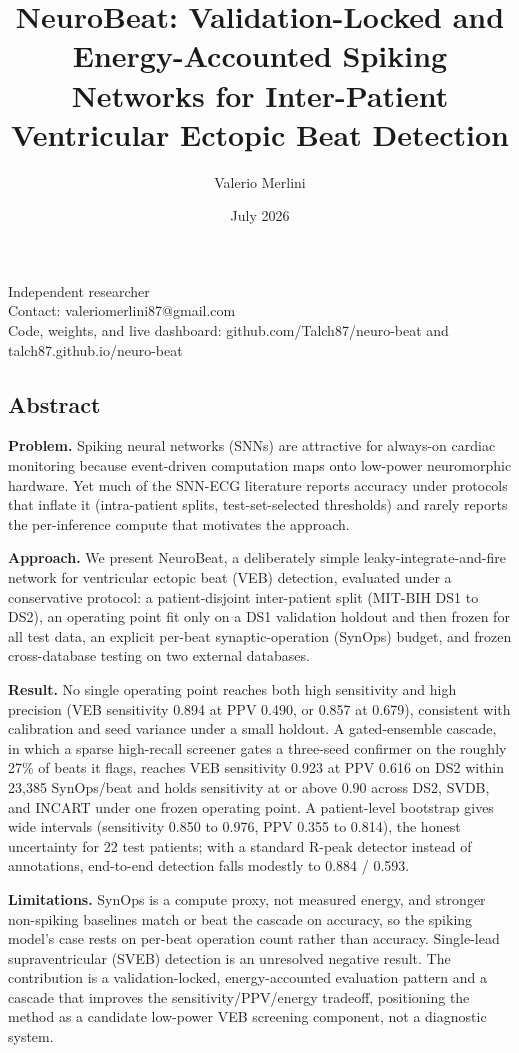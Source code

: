 \documentclass[
]{article}
\title{NeuroBeat: Validation-Locked and Energy-Accounted Spiking
Networks for Inter-Patient Ventricular Ectopic Beat Detection}
\author{Valerio Merlini}
\date{July 2026}
\begin{document}
\maketitle

Independent researcher\\
Contact: valeriomerlini87@gmail.com\\
Code, weights, and live dashboard: github.com/Talch87/neuro-beat and
talch87.github.io/neuro-beat

\subsection{Abstract}\label{abstract}

\textbf{Problem.} Spiking neural networks (SNNs) are attractive for
always-on cardiac monitoring because event-driven computation maps onto
low-power neuromorphic hardware. Yet much of the SNN-ECG literature
reports accuracy under protocols that inflate it (intra-patient splits,
test-set-selected thresholds) and rarely reports the per-inference
compute that motivates the approach.

\textbf{Approach.} We present NeuroBeat, a deliberately simple
leaky-integrate-and-fire network for ventricular ectopic beat (VEB)
detection, evaluated under a conservative protocol: a patient-disjoint
inter-patient split (MIT-BIH DS1 to DS2), an operating point fit only on
a DS1 validation holdout and then frozen for all test data, an explicit
per-beat synaptic-operation (SynOps) budget, and frozen cross-database
testing on two external databases.

\textbf{Result.} No single operating point reaches both high sensitivity
and high precision (VEB sensitivity 0.894 at PPV 0.490, or 0.857 at
0.679), consistent with calibration and seed variance under a small
holdout. A gated-ensemble cascade, in which a sparse high-recall
screener gates a three-seed confirmer on the roughly 27\% of beats it
flags, reaches VEB sensitivity 0.923 at PPV 0.616 on DS2 within 23,385
SynOps/beat and holds sensitivity at or above 0.90 across DS2, SVDB, and
INCART under one frozen operating point. A patient-level bootstrap gives
wide intervals (sensitivity 0.850 to 0.976, PPV 0.355 to 0.814), the
honest uncertainty for 22 test patients; with a standard R-peak detector
instead of annotations, end-to-end detection falls modestly to 0.884 /
0.593.

\textbf{Limitations.} SynOps is a compute proxy, not measured energy,
and stronger non-spiking baselines match or beat the cascade on
accuracy, so the spiking model's case rests on per-beat operation count
rather than accuracy. Single-lead supraventricular (SVEB) detection is
an unresolved negative result. The contribution is a validation-locked,
energy-accounted evaluation pattern and a cascade that improves the
sensitivity/PPV/energy tradeoff, positioning the method as a candidate
low-power VEB screening component, not a diagnostic system.
\end{document}
